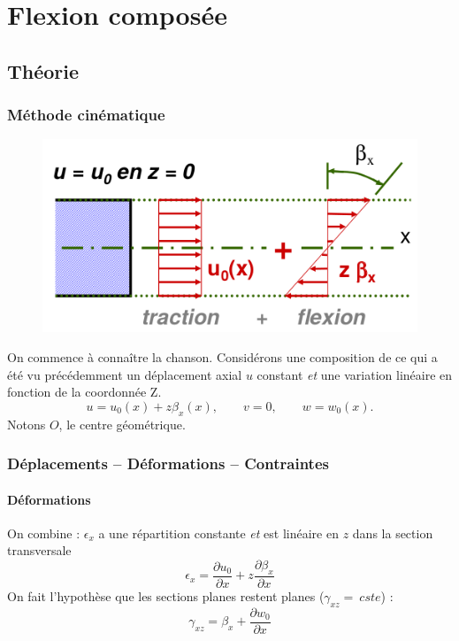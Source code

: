 \chapter{Flexion composée}
\section{Théorie}
	\subsection{Méthode cinématique}
	\begin{figure}
	\vspace{-10mm}
	\includegraphics[scale=0.4]{ch7/image1.png}
	\end{figure}
	On commence à connaître la chanson. Considérons une composition de ce qui a 
	été vu précédemment  un déplacement axial $u$ constant \textit{et} une 
	variation linéaire en fonction de la coordonnée Z.
	\begin{equation}
	u=u_0(x) + z\beta_x(x),\qquad v=0,\qquad w=w_0(x).
	\end{equation}
	Notons $O$, le centre géométrique.
	
	\subsection{Déplacements – Déformations – Contraintes}
		\subsubsection{Déformations}
		On combine : $\epsilon_x$ a une répartition constante \textit{et} est 
		linéaire en $z$ dans la section transversale 
		\begin{equation}
		\epsilon_x = \dfrac{\partial u_0}{\partial x}+z\dfrac{\partial\beta_x}{
		\partial x}
		\end{equation}
		On fait l'hypothèse que les sections planes restent planes ($\gamma_{xz}=\ 
		cste$) :
		\begin{equation}
		\gamma_{xz} = \beta_x+\dfrac{\partial w_0}{\partial x}
		\end{equation}
		
